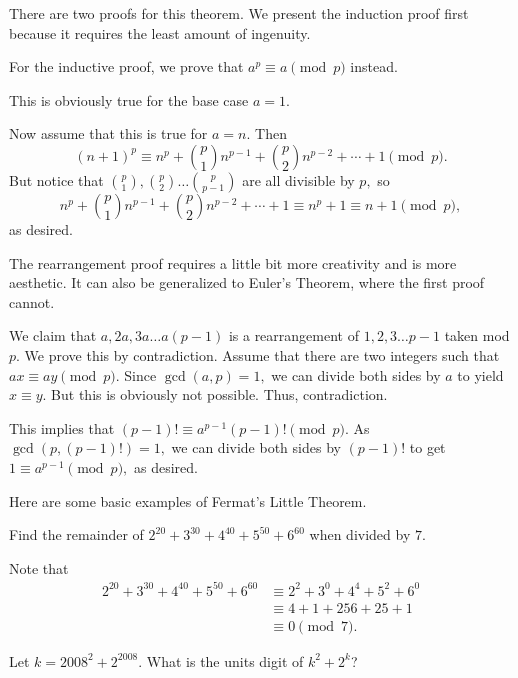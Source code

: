 \documentclass[mast]{lucky}
\begin{document}
There are two proofs for this theorem. We present the induction proof first because it requires the least amount of ingenuity.
\begin{pro}[1 (Induction)]
For the inductive proof, we prove that $a^p\equiv a\pmod{p}$ instead.

This is obviously true for the base case $a=1.$

Now assume that this is true for $a=n.$ Then
\[(n+1)^p\equiv n^p+\binom{p}{1}n^{p-1}+\binom{p}{2}n^{p-2}+\cdots+1\pmod{p}.\]
But notice that $\binom{p}{1},\binom{p}{2}\dots\binom{p}{p-1}$ are all divisible by $p,$ so
\[n^p+\binom{p}{1}n^{p-1}+\binom{p}{2}n^{p-2}+\cdots+1\equiv n^p+1\equiv n+1 \pmod{p},\]
as desired.
\end{pro}
The rearrangement proof requires a little bit more creativity and is more aesthetic. It can also be generalized to Euler's Theorem, where the first proof cannot.
\begin{pro}[2 (Rearrangement)]
We claim that $a,2a,3a\dots a(p-1)$ is a rearrangement of $1,2,3\dots p-1$ taken mod $p.$ We prove this by contradiction. Assume that there are two integers such that $ax\equiv ay \pmod{p}.$ Since $\gcd(a,p)=1,$ we can divide both sides by $a$ to yield $x\equiv y.$ But this is obviously not possible. Thus, contradiction.

This implies that $(p-1)!\equiv a^{p-1}(p-1)! \pmod{p}.$ As $\gcd(p,(p-1)!)=1,$ we can divide both sides by $(p-1)!$ to get $1\equiv a^{p-1}\pmod{p},$ as desired.
\end{pro}

Here are some basic examples of Fermat's Little Theorem.

\begin{exam}
Find the remainder of $2^{20} + 3^{30} + 4^{40} + 5^{50} + 6^{60}$ when divided by $7.$
\end{exam}

\begin{sol}
Note that
\begin{align*}
2^{20} + 3^{30} + 4^{40} + 5^{50} + 6^{60}&\equiv 2^2+3^0+4^4+5^2+6^0\\
&\equiv 4+1+256+25+1 \\
&\equiv 0\pmod{7}.
\end{align*}
\end{sol}

\begin{exam}[AMC 12A 2008/15]
Let $k={2008}^{2}+{2}^{2008}$. What is the units digit of $k^2+2^k$?
\end{exam}
\end{document}
